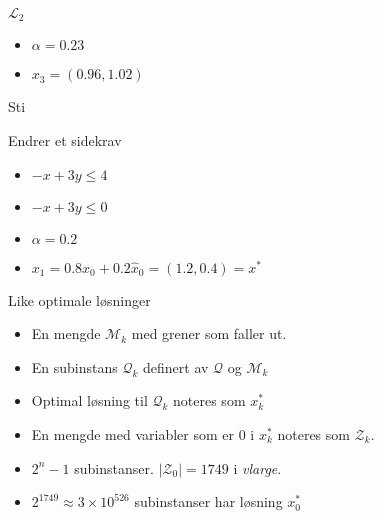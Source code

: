 \documentclass{beamer}
\begin{document}
\begin{frame}{$\mathcal{L}_2$}
\begin{center}

\end{center}
\begin{itemize}
\item $\alpha = 0.23$
\item $x_3 = (0.96, 1.02)$
\end{itemize}
\end{frame}



\begin{frame}{Sti}
\begin{center}

\end{center}
\end{frame}



\begin{frame}{Endrer et sidekrav}
\begin{center}

\end{center}
\begin{itemize}
\item $-x + 3y \leq 4$
\item $-x + 3y \leq 0$
\item $\alpha = 0.2$
\item $x_1 = 0.8x_0 + 0.2 \hat{x}_0 = (1.2,0.4) = x^*$
\end{itemize}
\end{frame}



\begin{frame}{Like optimale løsninger}
\begin{itemize}
\item En mengde $\mathcal{M}_k$ med grener som faller ut.
\item En subinstans $\mathcal{Q}_k$ definert av $\mathcal{Q}$ og $\mathcal{M}_k$
\item Optimal løsning til $\mathcal{Q}_k$ noteres som $x_k^*$
\item En mengde med variabler som er $0$ i $x_k^*$ noteres som $\mathcal{Z}_k$.
\item $2^n - 1$ subinstanser. $\left| \mathcal{Z}_0 \right| = 1749$ i \textit{vlarge}.
\item $2^{1749} \approx 3 \times 10^{526}$ subinstanser har løsning $x_0^*$
\end{itemize}
\end{frame}
\end{document}
